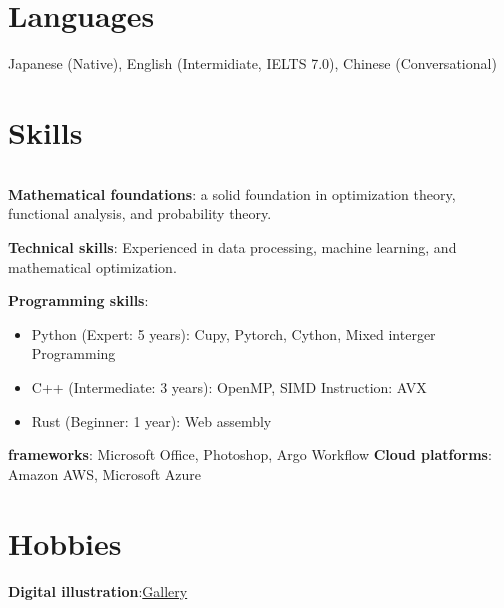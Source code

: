 \documentclass[a4paper,12pt]{article}
\begin{document}
\section{Languages}
Japanese (Native), English (Intermidiate, IELTS 7.0), Chinese (Conversational)

\section{Skills}
\begin{tabularx}{\linewidth}{@{}l X@{}}
\end{tabularx}


\textbf{Mathematical foundations}: a solid foundation in optimization theory, functional analysis, and probability theory. 

\textbf{Technical skills}: Experienced in data processing, machine learning, and mathematical optimization. 

\textbf{Programming skills}:
\begin{itemize}
\item Python (Expert: 5 years): Cupy, Pytorch, Cython, Mixed interger Programming
\item C++ (Intermediate: 3 years): OpenMP, SIMD Instruction: AVX 
\item Rust (Beginner: 1 year): Web assembly
\end{itemize}
\textbf{frameworks}: Microsoft Office, Photoshop, Argo Workflow
\textbf{Cloud platforms}: Amazon AWS, Microsoft Azure
\section{Hobbies}
\textbf{Digital illustration}:\href{https://www.deviantart.com/qdsn/gallery}{\faDeviantart Gallery}
\end{document}
